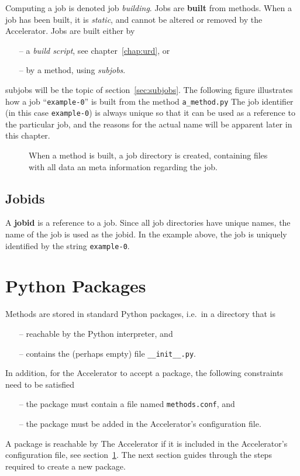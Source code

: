 Computing a job is denoted job \textsl{building}.
Jobs are \textbf{built} from methods.  When a job has been built, it
is \textsl{static}, and cannot be altered or removed by the
Accelerator.  Jobs are built either by
\begin{itemize}
\item[--] a \textsl{build script}, see chapter~\ref{chap:urd}, or
\item[--] by a method, using \textsl{subjobs}.
\end{itemize}
subjobs will be the topic of section~\ref{sec:subjobs}.  The following
figure illustrates how a job ``\texttt{example-0}'' is built from the
method \texttt{a\_method.py}
The job identifier (in this case \texttt{example-0}) is always unique
so that it can be used as a reference to the particular job, and the
reasons for the actual name will be apparent later in this chapter.
\begin{figure}[h!]
  \begin{center}
    
    \label{fig:method}
  \end{center}
  \caption{When a method is built, a job directory is created,
    containing files with all data an meta information regarding the
    job.}
\end{figure}



\subsection{Jobids}
A \textbf{jobid} is a reference to a job.  Since all job directories
have unique names, the name of the job is used as the jobid.  In the
example above, the job is uniquely identified by the
string \texttt{example-0}.



\section{Python Packages}
Methods are stored in standard Python packages, i.e.\ in a directory that is
\begin{itemize}
\item[--] reachable by the Python interpreter, and
\item[--] contains the (perhaps empty) file \texttt{\_\_init\_\_.py}.
\end{itemize}
In addition, for the Accelerator to accept a package, the following
constraints need to be satisfied
\begin{itemize}
\item[--] the package must contain a file named \texttt{methods.conf}, and
\item[--] the package must be added in the Accelerator's configuration file.
\end{itemize}
A package is reachable by The Accelerator if it is included in the
Accelerator's configuration file, see section~\ref{}.  The next
section guides through the steps required to create a new package.



